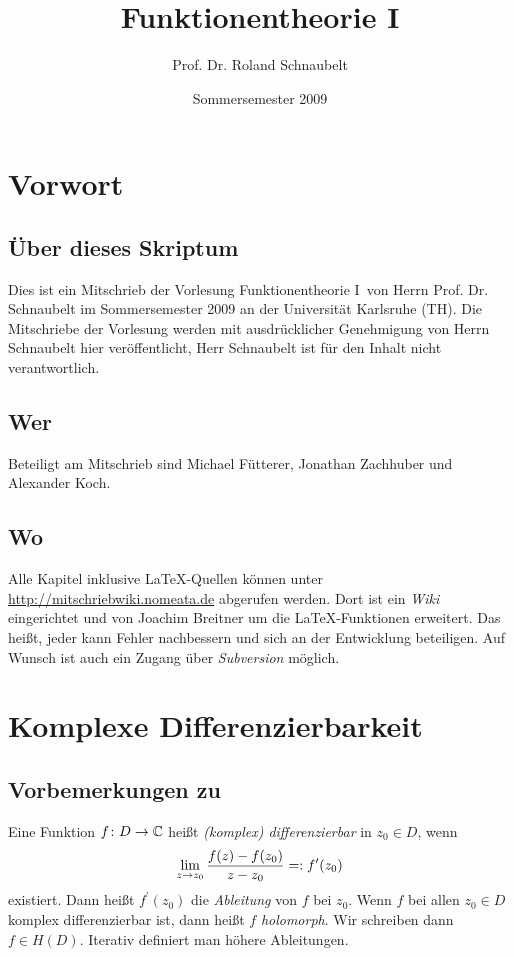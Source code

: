 \documentclass[a4paper,twoside,DIV15,BCOR12mm]{scrbook}
\author{Prof. Dr. Roland Schnaubelt}
\title{Funktionentheorie I}
\date{Sommersemester 2009}
\begin{document}
\maketitle

\chapter*{Vorwort}

\section*{Über dieses Skriptum}
Dies ist ein Mitschrieb der Vorlesung \glqq Funktionentheorie I\grqq\
von Herrn Prof. Dr. Schnaubelt im Sommersemester 2009 an der Universität Karlsruhe (TH).
Die Mitschriebe der Vorlesung werden mit ausdrücklicher Genehmigung von Herrn Schnaubelt hier veröffentlicht,
Herr Schnaubelt ist für den Inhalt nicht verantwortlich.

\section*{Wer}
Beteiligt am Mitschrieb sind Michael Fütterer, Jonathan Zachhuber und
Alexander Koch.

\section*{Wo}
Alle Kapitel inklusive \LaTeX-Quellen können unter \url{http://mitschriebwiki.nomeata.de} abgerufen werden.
Dort ist ein \emph{Wiki} eingerichtet und von Joachim Breitner um die \LaTeX-Funktionen erweitert.
Das heißt, jeder kann Fehler nachbessern und sich an der Entwicklung
beteiligen. Auf Wunsch ist auch ein Zugang über \emph{Subversion} möglich.


\tableofcontents




\chapter{Komplexe Differenzierbarkeit}

\section{Vorbemerkungen zu \C}



\begin{dfn} \label{dfn1.1}
  Eine Funktion $f\colon D \to \mathbb{C}$ heißt \emph{(komplex) differenzierbar} in $z_0 \in D$, wenn
  \[\lim_{z\to z_0}{\frac{f(z)-f(z_0)}{z-z_0}} =: f^\prime(z_0)\]
  existiert. Dann heißt $f^\prime(z_0)$ die \emph{Ableitung} von $f$ bei $z_0$. Wenn $f$ bei allen $z_0\in D$ komplex
  differenzierbar ist, dann heißt $f$ \emph{holomorph}. Wir schreiben dann $f\in H(D)$. Iterativ definiert man höhere
  Ableitungen.
\end{dfn}
\end{document}
